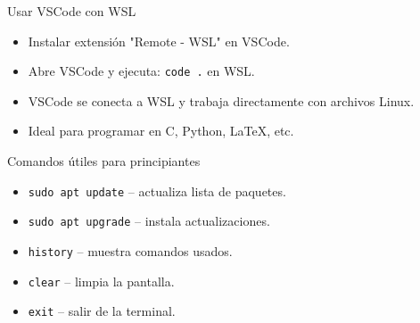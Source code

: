 \documentclass[aspectratio=169,professionalfonts]{beamer}
\begin{document}
\begin{frame}{Usar VSCode con WSL}
  \begin{itemize}
    \item Instalar extensión "Remote - WSL" en VSCode.
    \item Abre VSCode y ejecuta: \texttt{code .} en WSL.
    \item VSCode se conecta a WSL y trabaja directamente con archivos Linux.
    \item Ideal para programar en C, Python, LaTeX, etc.
  \end{itemize}
\end{frame}

\begin{frame}{Comandos útiles para principiantes}
  \begin{itemize}
    \item \texttt{sudo apt update} – actualiza lista de paquetes.
    \item \texttt{sudo apt upgrade} – instala actualizaciones.
    \item \texttt{history} – muestra comandos usados.
    \item \texttt{clear} – limpia la pantalla.
    \item \texttt{exit} – salir de la terminal.
  \end{itemize}
\end{frame}
\end{document}
